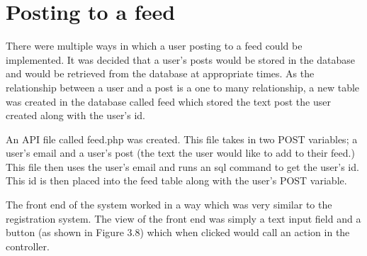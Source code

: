 \section{Posting to a feed}
There were multiple ways in which a user posting to a feed could be implemented. It was decided that a user's posts would be stored in the database and would be retrieved from the database at appropriate times. As the relationship between a user and a post is a one to many relationship, a new table was created in the database called feed which stored the text post the user created along with the user's id.

An API file called feed.php was created. This file takes in two POST variables; a user's email and a user's post (the text the user would like to add to their feed.) This file then uses the user's email and runs an sql command to get the user's id. This id is then placed into the feed table along with the user's POST variable.

The front end of the system worked in a way which was very similar to the registration system. The view of the front end was simply a text input field and a button (as shown in Figure 3.8) which when clicked would call an action in the controller.

